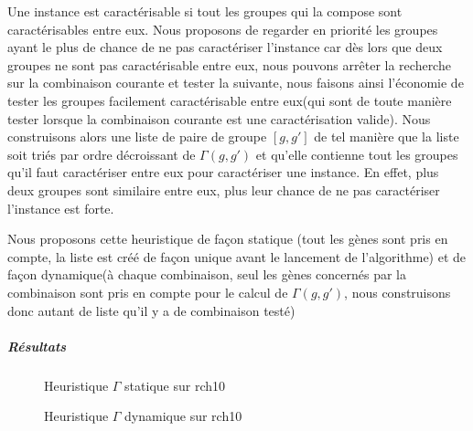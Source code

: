 
Une instance est caractérisable si tout les groupes qui la compose sont caractérisables entre eux. Nous proposons de regarder en priorité les groupes ayant le plus de chance de ne pas caractériser l'instance car dès lors que deux groupes ne sont pas caractérisable entre eux, nous pouvons arrêter la recherche sur la combinaison courante et tester la suivante, nous faisons ainsi l'économie de tester les groupes facilement caractérisable entre eux(qui sont de toute manière tester lorsque la combinaison courante est une caractérisation valide). Nous construisons alors une liste de paire de groupe $[g,g']$ de tel manière que la liste soit triés par ordre décroissant de $\Gamma(g,g')$ et qu'elle contienne tout les groupes qu'il faut caractériser entre eux pour caractériser une instance. En effet, plus deux groupes sont similaire entre eux, plus leur chance de ne pas caractériser l'instance est forte.

Nous proposons cette heuristique de façon statique (tout les gènes sont pris en compte, la liste est créé de façon unique avant le lancement de l'algorithme) et de façon dynamique(à chaque combinaison, seul les gènes concernés par la combinaison sont pris en compte pour le calcul de $\Gamma(g,g')$, nous construisons donc autant de liste qu'il y a de combinaison testé)



\subparagraph{Résultats}


\begin{figure}
\centering
	\begin{minipage}[c]{0.49\linewidth}
	\centering
	
	\end{minipage}
	\begin{minipage}[c]{0.49\linewidth}
	\centering
	
	\end{minipage}
\caption{Heuristique $\Gamma$ statique sur rch10}
\label{GammaStatiqueRch10}
\end{figure}

\begin{figure}
\centering
	\begin{minipage}[c]{0.49\linewidth}
	\centering
	
	\end{minipage}
	\begin{minipage}[c]{0.49\linewidth}
	\centering
	
	\end{minipage}
\caption{Heuristique $\Gamma$ dynamique sur rch10}
\label{GammaDynamiqueRch10}
\end{figure}

